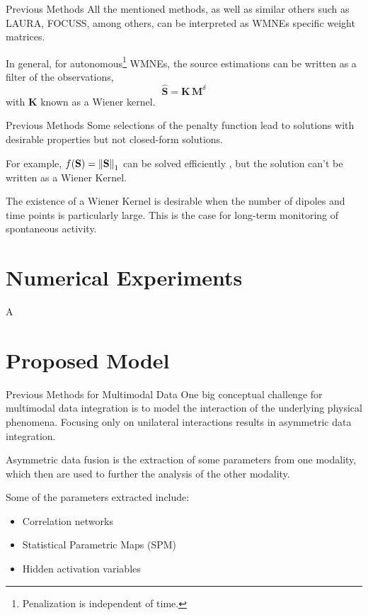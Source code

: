 \documentclass[progressbar=head]{beamer}
\begin{document}
\begin{frame}{Previous Methods}
All the mentioned methods, as well as similar others such as LAURA\cite{LAURA},  FOCUSS\cite{focuss}, among others,
can be interpreted as WMNEs 
specific
weight matrices.

In general, for autonomous\footnote{Penalization is independent of time.} WMNEs, the source estimations can be written as a filter of the observations,
\begin{equation}
    \hat{\mathbf{S}}
    =
    \mathbf{K}\,
    \mathbf{M}^\delta
\end{equation}
with $\mathbf{K}$ known as a \alert{Wiener kernel}.
\end{frame}

\begin{frame}{Previous Methods}
Some selections of the penalty function lead to solutions with desirable properties but not closed-form solutions.

For example, $f(\mathbf{S}) = \left\lVert \mathbf{S} \right\rVert_1$ can be solved efficiently \cite{review_sparse}, but the solution can't be written as a Wiener Kernel.

The existence of a Wiener Kernel is desirable when the number of dipoles and time points is particularly large. This is the case for long-term monitoring of spontaneous activity.
\end{frame}





{
\section{Numerical Experiments}
}

\begin{frame}{A}

\end{frame}

{
\section{Proposed Model}
}

\begin{frame}{Previous Methods for Multimodal Data}
One big conceptual challenge for multimodal data integration is to model the interaction of the underlying physical phenomena. 
%
Focusing only on unilateral interactions results in asymmetric data integration.

\alert{Asymmetric data fusion} is the extraction of some parameters from one modality, which then are used to further the analysis of the other modality.

Some of the parameters extracted include:
\begin{itemize}
    \item Correlation networks
    \item Statistical Parametric Maps (SPM)
    \item Hidden activation variables \cite{fire}
\end{itemize}

\end{frame}
\end{document}
